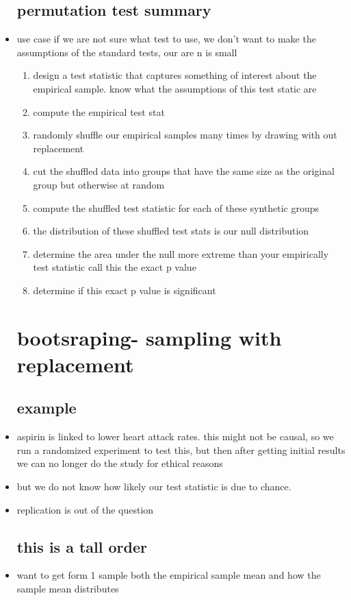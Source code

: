 \documentclass{article}
\begin{document}
\begin{itemize}
\subsection{permutation test summary}
\item use case if we are not sure what test to use, we don't want to make the assumptions of the standard tests, our are n is small
\begin{enumerate}
    \item design a test statistic that captures something of interest about the empirical sample. know what the assumptions of this test static are 
    \item compute the empirical test stat 
    \item randomly shuffle our empirical samples many times by drawing with out replacement 
    \item cut the shuffled data into groups that have the same size as the original group but otherwise at random 
    \item compute the shuffled test statistic for each of these synthetic groups
    \item the distribution of these shuffled test stats is our null distribution
    \item determine the area under the null more extreme than your empirically test statistic call this the exact p value 
    \item determine if this exact p value is significant 
    
    \end{enumerate}
    \section{bootsraping- sampling with replacement}
    \subsection{example}
    \item aspirin is linked to lower heart attack rates. this might not be causal, so we run a randomized experiment to test this, but then after getting initial results we can no longer do the study for ethical reasons 
    \item but we do not know how likely our test statistic is due to chance. 
    \item replication is out of the question 
    \subsection{this is a tall order}
    \item want to get form 1 sample both the empirical sample mean and how the sample mean distributes

\end{itemize}
\end{document}
